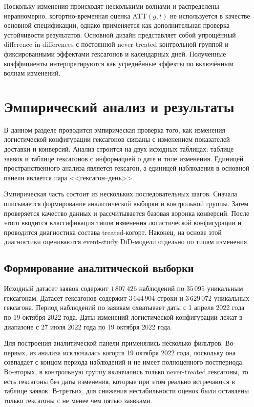 \documentclass[14pt,a4paper]{extarticle}
\begin{document}
Поскольку изменения происходят несколькими волнами и распределены неравномерно, когортно-временная оценка ATT\((g,t)\) не используется в качестве основной спецификации, однако применяется как дополнительная проверка устойчивости результатов. Основной дизайн представляет собой упрощённый difference-in-differences с постоянной never-treated контрольной группой и фиксированными эффектами гексагонов и календарных дней. Полученные коэффициенты интерпретируются как усреднённые эффекты по включённым волнам изменений.

\section{Эмпирический анализ и результаты} 
\label{sec:empirical_results}

В данном разделе проводится эмпирическая проверка того, как изменения логистической конфигурации гексагонов связаны с изменением показателей доставки и конверсий. Анализ строится на двух исходных таблицах: таблице заявок и таблице гексагонов с информацией о дате и типе изменения. Единицей пространственного анализа является гексагон, а единицей наблюдения в основной панели является пара <<гексагон--день>>.

Эмпирическая часть состоит из нескольких последовательных шагов. Сначала описывается формирование аналитической выборки и контрольной группы. Затем проверяется качество данных и рассчитывается базовая воронка конверсий. После этого вводится классификация типов изменения логистической конфигурации и проводится диагностика состава treated-когорт. Наконец, на основе этой диагностики оцениваются event-study DiD-модели отдельно по типам изменения. 

\subsection{Формирование аналитической выборки} 
\label{subsec:empirical_sample}

Исходный датасет заявок содержит \(1\,807\,426\) наблюдений по \(35\,095\) уникальным гексагонам. Датасет гексагонов содержит \(3\,644\,904\) строки и \(3\,629\,072\) уникальных гексагона. Период наблюдений по заявкам охватывает даты с 1 апреля 2022 года по 19 октября 2022 года. Даты изменений логистической конфигурации лежат в диапазоне с 27 июля 2022 года по 19 октября 2022 года.

Для построения аналитической панели применялись несколько фильтров. Во-первых, из анализа исключалась когорта 19 октября 2022 года, поскольку она совпадает с концом периода наблюдений и не имеет полноценного постпериода. Во-вторых, в контрольную группу включались только never-treated гексагоны, то есть гексагоны без даты изменения, которые при этом реально встречаются в таблице заявок. В-третьих, для снижения нестабильности оценок были оставлены только гексагоны с не менее чем пятью заявками.
\end{document}
